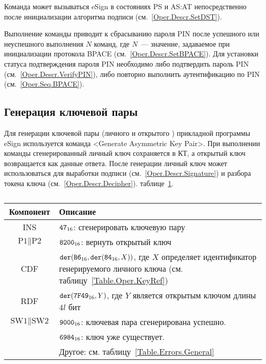 
Команда может вызываться  eSign в состояниях 
PS и AS:AT непосредственно после инициализации алгоритма подписи
(см.~\ref{Oper.Descr.SetDST}).

Выполнение команды приводит к сбрасыванию  пароля PIN
после успешного или неуспешного выполнения $N$ команд, где $N$~--- значение, 
задаваемое при инициализации протокола BPACE (см.~\ref{Oper.Descr.SetBPACE}).
Для установки статуса подтверждения пароля PIN 
необходимо либо подтвердить пароль PIN (см.~\ref{Oper.Descr.VerifyPIN}), 
либо повторно выполнить аутентификацию по PIN (см.~\ref{Oper.Seq.BPACE}).

\subsection{Генерация ключевой пары}\label{Oper.Descr.GenKeys}

Для генерации ключевой пары (личного и открытого ) прикладной 
программы eSign используется команда <Generate Asymmetric Key Pair>. При 
выполнении команды сгенерированный личный ключ сохраняется в КТ,
а открытый ключ возвращается как данные ответа.
После генерации личный ключ может использоваться 
для выработки подписи (см.~\ref{Oper.Descr.Signature}) и
разбора токена ключа (см.~\ref{Oper.Descr.Decipher}).
 таблице~\ref{Table.Oper.GenKeysCmd}.

\begin{table}[hbt]
\caption{}\label{Table.Oper.GenKeysCmd}
\begin{tabular}{|c|p{14cm}|}
\hline
Компонент & Описание\\
\hline
\hline
INS & $\texttt{47}_{16}$: сгенерировать ключевую пару \\
\hline
$\text{P1} \parallel\text{P2}$ & $\texttt{8200}_{16}$:
вернуть открытый ключ \\
\hline
CDF & $\texttt{der}(\texttt{B6}_{16},\texttt{der}(\texttt{84}_{16}, X))$,
где $X$ определяет идентификатор генерируемого личного ключа
(см. таблицу~\ref{Table.Oper.KeyRef}) \\
\hline 
RDF & $\texttt{der}(\texttt{7F49}_{16}, Y)$, где $Y$ является открытым ключом длины $4l$ бит\\
\hline
$\text{SW1} \parallel \text{SW2}$ & 
$\texttt{9000}_{16}$: ключевая пара сгенерирована успешно. \\
  & $\texttt{6984}_{16}$: ключ уже существует. \\
  & Другое: см. таблицу~\ref{Table.Errors.General} \\
\hline
\end{tabular}
\end{table}

